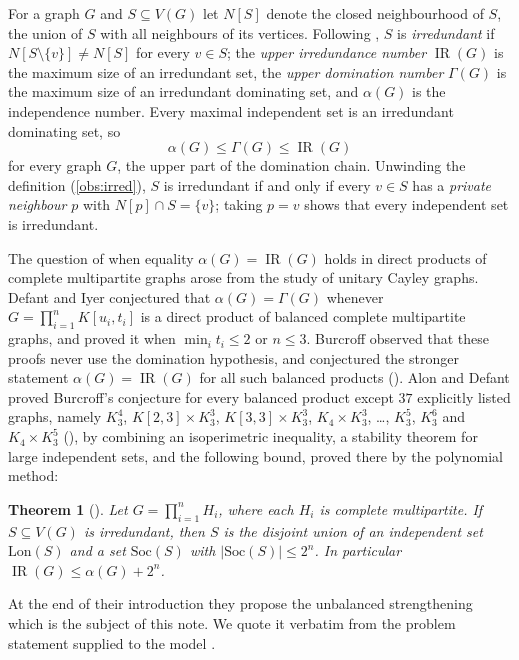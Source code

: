 \documentclass[11pt,a4paper]{article}
\theoremstyle{plain}
\newtheorem{theorem}{Theorem}[section]
\theoremstyle{definition}
\theoremstyle{remark}
\newcommand{\IR}{\operatorname{IR}}
\newcommand{\Kmp}[1]{K[#1]}
\begin{document}
For a graph $G$ and $S\subseteq V(G)$ let $N[S]$ denote the closed neighbourhood of $S$, the union of $S$ with all neighbours of its vertices. Following \cite{AD20}, $S$ is \emph{irredundant} if $N[S\setminus\{v\}]\neq N[S]$ for every $v\in S$; the \emph{upper irredundance number} $\IR(G)$ is the maximum size of an irredundant set, the \emph{upper domination number} $\Gamma(G)$ is the maximum size of an irredundant dominating set, and $\alpha(G)$ is the independence number. Every maximal independent set is an irredundant dominating set, so
\begin{equation}\label{eq:chain}
\alpha(G)\le\Gamma(G)\le\IR(G)
\end{equation}
for every graph $G$, the upper part of the domination chain. Unwinding the definition (\cref{obs:irred}), $S$ is irredundant if and only if every $v\in S$ has a \emph{private neighbour} $p$ with $N[p]\cap S=\{v\}$; taking $p=v$ shows that every independent set is irredundant.

The question of when equality $\alpha(G)=\IR(G)$ holds in direct products of complete multipartite graphs arose from the study of unitary Cayley graphs. Defant and Iyer \cite{DI18} conjectured that $\alpha(G)=\Gamma(G)$ whenever $G=\prod_{i=1}^n\Kmp{u_i,t_i}$ is a direct product of balanced complete multipartite graphs, and proved it when $\min_it_i\le2$ or $n\le3$. Burcroff \cite{Bur23} observed that these proofs never use the domination hypothesis, and conjectured the stronger statement $\alpha(G)=\IR(G)$ for all such balanced products (\cite[Conjecture~1.1]{AD20}). Alon and Defant \cite{AD20} proved Burcroff's conjecture for every balanced product except $37$ explicitly listed graphs, namely $K_3^4$, $\Kmp{2,3}\times K_3^3$, $\Kmp{3,3}\times K_3^3$, $K_4\times K_3^3$, \dots, $K_3^5$, $K_3^6$ and $K_4\times K_3^5$ (\cite[Theorem~1.2 and Section~3]{AD20}), by combining an isoperimetric inequality, a stability theorem for large independent sets, and the following bound, proved there by the polynomial method:

\begin{theorem}[{\cite[Theorem~1.3]{AD20}}]\label{thm:AD13}
Let $G=\prod_{i=1}^nH_i$, where each $H_i$ is complete multipartite. If $S\subseteq V(G)$ is irredundant, then $S$ is the disjoint union of an independent set $\mathrm{Lon}(S)$ and a set $\mathrm{Soc}(S)$ with $|\mathrm{Soc}(S)|\le2^n$. In particular $\IR(G)\le\alpha(G)+2^n$.
\end{theorem}

\noindent At the end of their introduction they propose the unbalanced strengthening which is the subject of this note. We quote it verbatim from the problem statement supplied to the model \cite{AD20}.
\end{document}
